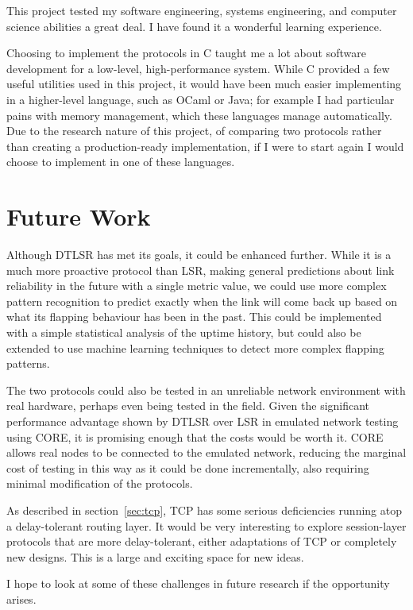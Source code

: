 \documentclass[withindex,glossary,openany]{cam-thesis}
\begin{document}
This project tested my software engineering, systems engineering, and computer science abilities a great deal. I have found it a wonderful learning experience.

Choosing to implement the protocols in C taught me a lot about software development for a low-level, high-performance system. While C provided a few useful utilities used in this project, it would have been much easier implementing in a higher-level language, such as OCaml or Java; for example I had particular pains with memory management, which these languages manage automatically. Due to the research nature of this project, of comparing two protocols rather than creating a production-ready implementation, if I were to start again I would choose to implement in one of these languages.

\section{Future Work}

Although DTLSR has met its goals, it could be enhanced further. While it is a much more proactive protocol than LSR, making general predictions about link reliability in the future with a single metric value, we could use more complex pattern recognition to predict exactly when the link will come back up based on what its flapping behaviour has been in the past. This could be implemented with a simple statistical analysis of the uptime history, but could also be extended to use machine learning techniques to detect more complex flapping patterns.

The two protocols could also be tested in an unreliable network environment with real hardware, perhaps even being tested in the field. Given the significant performance advantage shown by DTLSR over LSR in emulated network testing using CORE, it is promising enough that the costs would be worth it. CORE allows real nodes to be connected to the emulated network, reducing the marginal cost of testing in this way as it could be done incrementally, also requiring minimal modification of the protocols.

As described in section~\ref{sec:tcp}, TCP has some serious deficiencies running atop a delay-tolerant routing layer. It would be very interesting to explore session-layer protocols that are more delay-tolerant, either adaptations of TCP or completely new designs. This is a large and exciting space for new ideas.

I hope to look at some of these challenges in future research if the opportunity arises.
\end{document}
